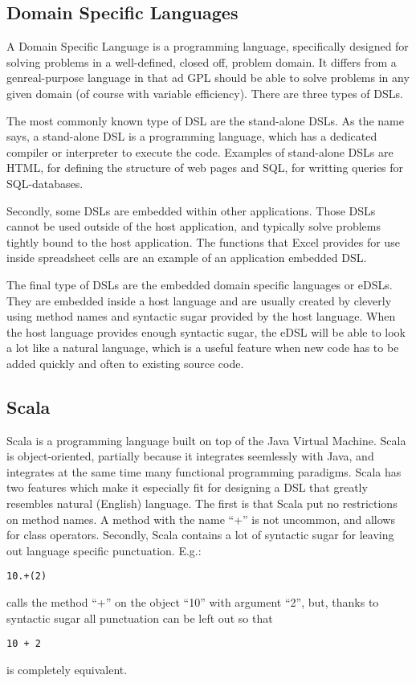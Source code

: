 \documentclass[twocolumn]{phdsymp}
\begin{document}
\subsection{Domain Specific Languages}
A Domain Specific Language is a programming language, specifically designed for solving problems in a well-defined, closed off, problem domain. It differs from a genreal-purpose language in that ad GPL should be able to solve problems in any given domain (of course with variable efficiency). There are three types of DSLs.

The most commonly known type of DSL are the stand-alone DSLs. As the name says, a stand-alone DSL is a programming language, which has a dedicated compiler or interpreter to execute the code. Examples of stand-alone DSLs are HTML, for defining the structure of web pages and SQL, for writting queries for SQL-databases.

Secondly, some DSLs are embedded within other applications. Those DSLs cannot be used outside of the host application, and typically solve problems tightly bound to the host application. The functions that Excel provides for use inside spreadsheet cells are an example of an application embedded DSL.

The final type of DSLs are the embedded domain specific languages or eDSLs. They are embedded inside a host language and are usually created by cleverly using method names and syntactic sugar provided by the host language. When the host language provides enough syntactic sugar, the eDSL will be able to look a lot like a natural language, which is a useful feature when new code has to be added quickly and often to existing source code.
\subsection{Scala}
Scala is a programming language built on top of the Java Virtual Machine. Scala is object-oriented, partially because it integrates seemlessly with Java, and integrates at the same time many functional programming paradigms. Scala has two features which make it especially fit for designing a DSL that greatly resembles natural (English) language. The first is that Scala put no restrictions on method names. A method with the name ``+'' is not uncommon, and allows for class operators. Secondly, Scala contains a lot of syntactic sugar for leaving out language specific punctuation. E.g.:
\begin{verbatim}
10.+(2)
\end{verbatim}
calls the method ``+'' on the object ``10'' with argument ``2'', but, thanks to syntactic sugar all punctuation can be left out so that
\begin{verbatim}
10 + 2
\end{verbatim}
is completely equivalent.
\end{document}
